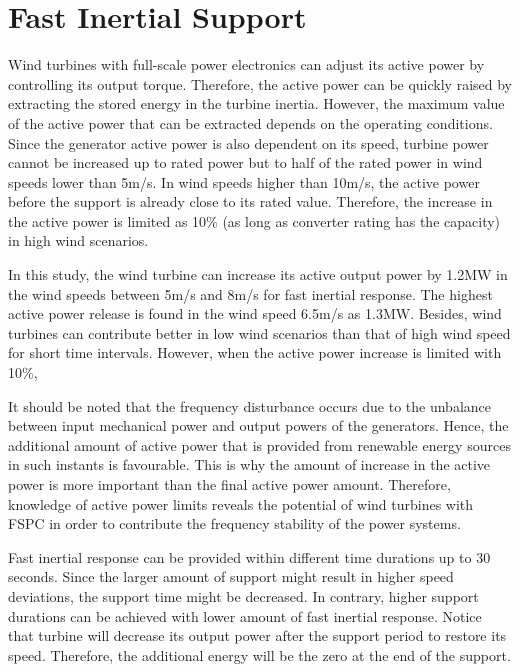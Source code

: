 \section{Fast Inertial Support}
Wind turbines with full-scale power electronics can adjust its active power by controlling its output torque. Therefore, the active power can be quickly raised by extracting the stored energy in the turbine inertia. However, the maximum value of the active power that can be extracted depends on the operating conditions. Since the generator active power is also dependent on its speed, turbine power cannot be increased up to rated power but to half of the rated power in wind speeds lower than 5m/s. In wind speeds higher than 10m/s, the active power before the support is already close to its rated value. Therefore, the increase in the active power is limited as 10\% (as long as converter rating has the capacity) in high wind scenarios. \par
In this study, the wind turbine can increase its active output power by 1.2MW in the wind speeds between 5m/s and 8m/s for fast inertial response. The highest active power release is found in the wind speed 6.5m/s as 1.3MW. Besides, wind turbines can contribute better in low wind scenarios than that of high wind speed for short time intervals. However, when the active power increase is limited with 10\%, \par
It should be noted that the frequency disturbance occurs due to the unbalance between input mechanical power and output powers of the generators. Hence, the additional amount of active power that is provided from renewable energy sources in such instants is favourable. This is why the amount of increase in the active power is more important than the final active power amount. Therefore, knowledge of active power limits reveals the potential of wind turbines with FSPC in order to contribute the frequency stability of the power systems.\par
Fast inertial response can be provided within different time durations up to 30 seconds. Since the larger amount of support might result in higher speed deviations, the support time might be decreased. In contrary, higher support durations can be achieved with lower amount of fast inertial response. Notice that turbine will decrease its output power after the support period to restore its speed. Therefore, the additional energy will be the zero at the end of the support. \par
